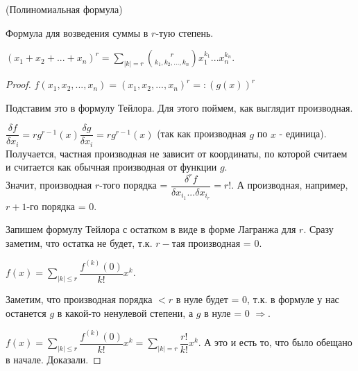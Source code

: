 \begin{consequence} (Полиномиальная формула)
	
	Формула для возведения суммы в $r$-тую степень. 
	
	$(x_1 + x_2 + ... + x_n)^r = \sum\limits_{|k| = r} {r\choose {k_1, k_2, ..., k_n}} x_1^{k_1}...x_n^{k_n}$.
\end{consequence}

\begin{proof}
	
	$f(x_1, x_2, ..., x_n) = (x_1, x_2, ...,x_n)^r =: (g(x))^r$
	
	Подставим это в формулу Тейлора. Для этого поймем, как выглядит производная.
	
	$\dfrac{\delta f}{\delta x_i} = rg^{r - 1}(x)\dfrac{\delta g}{\delta x_i} = rg^{r - 1}(x)$ (так как производная $g$ по $x$ - единица). Получается, частная производная не зависит от координаты, по которой считаем и считается как обычная производная от функции $g$. \\ Значит, производная $r$-того порядка = $\dfrac{\delta^r f}{\delta x_{i_1} ... \delta x_{i_r}} = r!$. А производная, например, $r + 1$-го порядка = 0.
	
	Запишем формулу Тейлора с остатком в виде в форме Лагранжа для $r$. Сразу заметим, что остатка не будет, т.к. $r-$тая производная = 0.
	
	$f(x) = \sum\limits_{|k| \leq r} \dfrac{f^{(k)}(0)}{k!} x^k$.
	
	Заметим, что производная порядка $< r$ в нуле будет = 0, т.к. в формуле у нас останется $g$ в какой-то ненулевой степени, а $g$ в нуле = 0 $\Rightarrow$.
	
	$f(x) = \sum\limits_{|k| \leq r} \dfrac{f^{(k)}(0)}{k!} x^k = \sum\limits_{|k| = r}\dfrac{r!}{k!}x^k$. А это и есть то, что было обещано в начале. Доказали.
	
\end{proof}
